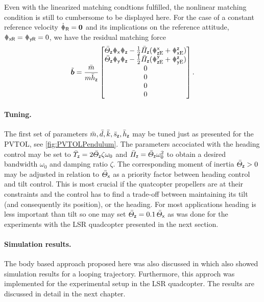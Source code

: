 Even with the linearized matching condtions fulfilled, the nonlinear matching condition is still to cumbersome to be displayed here.
For the case of a constant reference velocity $\vRd = \tuple{0}$ and its implications on the reference attitude, $\wRx=\wRy=0$, we have the residual matching force
\begin{align} 
 \tilde{\sysForce} = \frac{\mc}{\m\hcz}\begin{bmatrix} \Jcz\wx\wz - \tfrac{1}{2}\kapcz(\RExz+\REzx) \\ \Jcz\wy\wz - \tfrac{1}{2}\kapcz(\REyz+\REzy) \\ 0 \\ 0 \\ 0 \\ 0 \end{bmatrix}
 .
\end{align}

\paragraph{Tuning.}
The first set of parameters $\bar{m}, \bar{d}, \bar{k}, \bar{s}_{\mathsf{z}}, \bar{h}_{\mathsf{z}}$ may be tuned just as presented for the PVTOL, see \autoref{fig:PVTOLPendulum}.
The parameters accociated with the heading control may be set to $\bar{\varUpsilon}_{\mathsf{z}}=2\bar{\varTheta}_{\mathsf{z}}\zeta\omega_0$ and $\bar{\varPi}_{\mathsf{z}}=\bar{\varTheta}_{\mathsf{z}}\omega_0^2$ to obtain a desired bandwidth $\omega_0$ and damping ratio $\zeta$.
The corresponding moment of inertia $\bar{\varTheta}_{\mathsf{z}} > 0$ may be adjusted in relation to $\bar{\varTheta}_{\mathsf{x}}$ as a priority factor between heading control and tilt control.
This is most crucial if the quatcopter propellers are at their constraints and the control has to find a trade-off between maintaining its tilt (and consequently its position), or the heading.
For most applications heading is less important than tilt so one may set $\bar{\varTheta}_{\mathsf{z}} = 0.1\,\bar{\varTheta}_{\mathsf{x}}$ as was done for the experiments with the LSR quadcopter presented in the next section.


\paragraph{Simulation results.}
The body based approach proposed here was also discussed in \cite{Konz:GaussTrackingControl} which also showed simulation results for a looping trajectory.
Furthermore, this approch was implemented for the experimental setup in the LSR quadcopter.
The results are discussed in detail in the next chapter.
